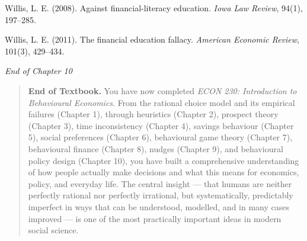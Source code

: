 \documentclass[12pt, letterpaper]{article}
\begin{document}
Willis, L. E. (2008). Against financial-literacy education. \textit{Iowa Law Review}, 94(1), 197--285.

Willis, L. E. (2011). The financial education fallacy. \textit{American Economic Review}, 101(3), 429--434.

\medskip

\textit{End of Chapter 10}

\medskip

\begin{quote}
\textbf{End of Textbook.} You have now completed \textit{ECON 230: Introduction to Behavioural Economics}. From the rational choice model and its empirical failures (Chapter 1), through heuristics (Chapter 2), prospect theory (Chapter 3), time inconsistency (Chapter 4), savings behaviour (Chapter 5), social preferences (Chapter 6), behavioural game theory (Chapter 7), behavioural finance (Chapter 8), nudges (Chapter 9), and behavioural policy design (Chapter 10), you have built a comprehensive understanding of how people actually make decisions and what this means for economics, policy, and everyday life. The central insight --- that humans are neither perfectly rational nor perfectly irrational, but systematically, predictably imperfect in ways that can be understood, modelled, and in many cases improved --- is one of the most practically important ideas in modern social science.
\end{quote}
\end{document}
